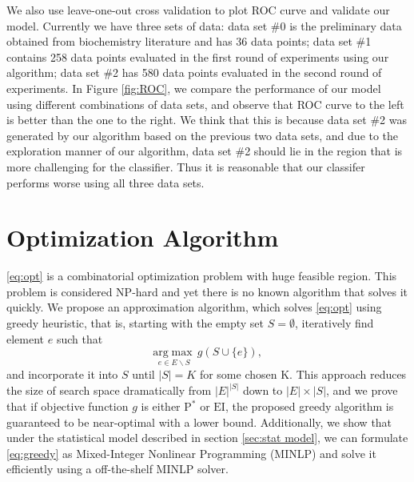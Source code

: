 \documentclass[opre,nonblindrev]{informs3} %
\newcommand{\EI}{\mathrm{EI}}
\newcommand{\PI}{\text{P}^*}
\begin{document}
We also use leave-one-out cross validation to plot ROC curve and validate our model. Currently we have three sets of data: data set \#0 is the preliminary data obtained from biochemistry literature and has 36 data points; data set \#1 contains 258 data points evaluated in the first round of experiments using our algorithm; data set \#2 has 580 data points evaluated in the second round of experiments. In Figure \ref{fig:ROC}, we compare the performance of our model using different combinations of data sets, and observe that ROC curve to the left is better than the one to the right. We think that this is because data set \#2 was generated by our algorithm based on the previous two data sets, and due to the exploration manner of our algorithm, data set \#2 should lie in the region that is more challenging for the classifier. Thus it is reasonable that our classifer performs worse using all three data sets. 

\section{Optimization Algorithm}
\eqref{eq:opt} is a combinatorial optimization problem with huge feasible region. This problem is considered NP-hard and yet there is no known algorithm that solves it quickly. We propose an approximation algorithm, which solves \eqref{eq:opt} using greedy heuristic, that is, starting with the empty set $S=\emptyset$, iteratively find element $e$ such that 
\begin{equation} \label{eq:greedy}
  \underset{e \in E \backslash S}{\mathrm{arg}\max} \,g(S \cup \{e\}),
\end{equation}
and incorporate it into $S$ until $|S|=K$ for some chosen K. This approach reduces the size of search space dramatically from $|E|^{|S|}$ down to $|E| \times |S|$, and we prove that if objective function $g$ is either $\PI$ or $\EI$, the proposed greedy algorithm is guaranteed to be near-optimal with a lower bound. Additionally, we show that under the statistical model described in section \ref{sec:stat model}, we can formulate \eqref{eq:greedy} as Mixed-Integer Nonlinear Programming
(MINLP) and solve it efficiently using a off-the-shelf MINLP solver.
\end{document}
